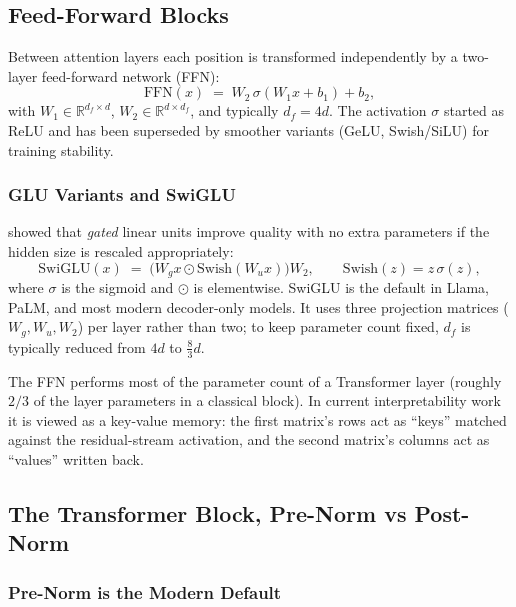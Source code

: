 \subsection{Feed-Forward Blocks}

Between attention layers each position is transformed independently
by a two-layer feed-forward network (FFN):
\begin{equation}
\label{eq:week4-ffn-classic}
\mathrm{FFN}(x) \;=\; W_2 \,\sigma(W_1 x + b_1) + b_2,
\end{equation}
with $W_1 \in \mathbb{R}^{d_f \times d}$, $W_2 \in \mathbb{R}^{d \times d_f}$,
and typically $d_f = 4d$. The activation $\sigma$ started as ReLU and
has been superseded by smoother variants (GeLU, Swish/SiLU) for
training stability.

\subsubsection{GLU Variants and SwiGLU}

\citet{shazeer2020glu} showed that \emph{gated} linear units improve
quality with no extra parameters if the hidden size is rescaled
appropriately:
\begin{equation}
\label{eq:week4-swiglu}
\mathrm{SwiGLU}(x)
 \;=\; \bigl(W_g x \odot \mathrm{Swish}(W_u x)\bigr) W_2,
\qquad
\mathrm{Swish}(z) = z\,\sigma(z),
\end{equation}
where $\sigma$ is the sigmoid and $\odot$ is elementwise. SwiGLU is
the default in Llama, PaLM, and most modern decoder-only models. It
uses three projection matrices ($W_g, W_u, W_2$) per layer rather
than two; to keep parameter count fixed, $d_f$ is typically reduced
from $4d$ to $\tfrac{8}{3}d$.

The FFN performs most of the parameter count of a Transformer layer
(roughly $2/3$ of the layer parameters in a classical block). In
current interpretability work it is viewed as a key-value memory:
the first matrix's rows act as ``keys'' matched against the
residual-stream activation, and the second matrix's columns act as
``values'' written back.

\subsection{The Transformer Block, Pre-Norm vs Post-Norm}

\subsubsection{Pre-Norm is the Modern Default}


